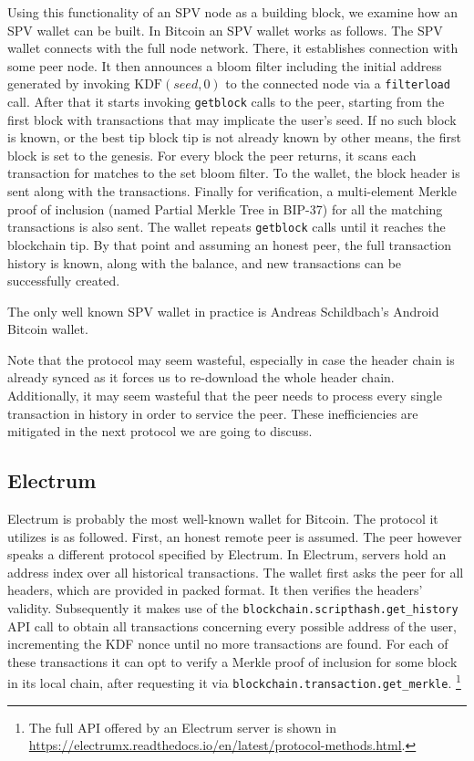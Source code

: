 \documentclass[sigconf]{acmart}
\begin{document}
Using this functionality of an SPV node as a building block, we examine how an SPV wallet can be built. In Bitcoin an SPV wallet works as follows. The SPV wallet connects with the full node network. There, it establishes connection with some peer node. It then announces a bloom filter including the initial address generated by invoking $\text{KDF}(seed, 0)$ to the connected node via a \texttt{filterload} call. After that it starts invoking \texttt{getblock} calls to the peer, starting from the first block with transactions that may implicate the user's seed. If no such block is known, or the best tip block tip is not already known by other means, the first block is set to the genesis. For every block the peer returns, it scans each transaction for matches to the set bloom filter. To the wallet, the block header is sent along with the transactions. Finally for verification, a multi-element Merkle proof of inclusion (named Partial Merkle Tree in BIP-37) for all the matching transactions is also sent. The wallet repeats \texttt{getblock} calls until it reaches the blockchain tip. By that point and assuming an honest peer, the full transaction history is known, along with the balance, and new transactions can be successfully created.


The only well known SPV wallet in practice is Andreas Schildbach's Android Bitcoin wallet.

Note that the protocol may seem wasteful, especially in case the header chain is already synced as it forces us to re-download the whole header chain. Additionally, it may seem wasteful that the peer needs to process every single transaction in history in order to service the peer. These inefficiencies are mitigated in the next protocol we are going to discuss.


\subsection{Electrum}
Electrum is probably the most well-known wallet for Bitcoin.
The protocol it utilizes is as followed. First, an honest remote peer is assumed. The peer however speaks a different protocol specified by Electrum.
In Electrum, servers hold an address index over all historical transactions.
The wallet first asks the peer for all headers, which are provided in packed format. It then verifies the headers' validity. Subsequently it makes use of the \texttt{blockchain.scripthash.get\_history} API call to obtain all transactions concerning every possible address of the user, incrementing the KDF nonce until no more transactions are found. For each of these transactions it can opt to verify a Merkle proof of inclusion for some block in its local chain, after requesting it via \texttt{blockchain.transaction.get\_merkle}.
\footnote{The full API offered by an Electrum server is shown in \url{https://electrumx.readthedocs.io/en/latest/protocol-methods.html}.
}
\end{document}
